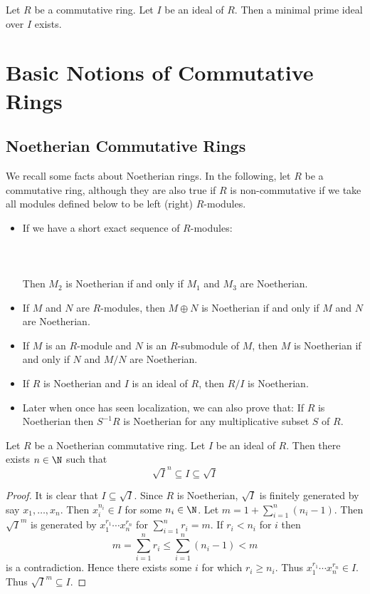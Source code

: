 \documentclass[a4paper]{article}
\begin{document}
\begin{prp}{}{} Let $R$ be a commutative ring. Let $I$ be an ideal of $R$. Then a minimal prime ideal over $I$ exists. 
\end{prp}

\pagebreak
\section{Basic Notions of Commutative Rings}
\subsection{Noetherian Commutative Rings}
We recall some facts about Noetherian rings. In the following, let $R$ be a commutative ring, although they are also true if $R$ is non-commutative if we take all modules defined below to be left (right) $R$-modules. 

\begin{itemize}
\item If we have a short exact sequence of $R$-modules: \\~\\
\\~\\
Then $M_2$ is Noetherian if and only if $M_1$ and $M_3$ are Noetherian. 
\item If $M$ and $N$ are $R$-modules, then $M\oplus N$ is Noetherian if and only if $M$ and $N$ are Noetherian. 
\item If $M$ is an $R$-module and $N$ is an $R$-submodule of $M$, then $M$ is Noetherian if and only if $N$ and $M/N$ are Noetherian.
\item If $R$ is Noetherian and $I$ is an ideal of $R$, then $R/I$ is Noetherian. 
\item Later when once has seen localization, we can also prove that: If $R$ is Noetherian then $S^{-1}R$ is Noetherian for any multiplicative subset $S$ of $R$. 
\end{itemize}

\begin{prp}{}{} Let $R$ be a Noetherian commutative ring. Let $I$ be an ideal of $R$. Then there exists $n\in\N$ such that $$\sqrt{I}^n\subseteq I\subseteq\sqrt{I}$$ \tcbline
\begin{proof}
It is clear that $I\subseteq\sqrt{I}$. Since $R$ is Noetherian, $\sqrt{I}$ is finitely generated by say $x_1,\dots,x_n$. Then $x_i^{n_i}\in I$ for some $n_i\in\N$. Let $m=1+\sum_{i=1}^n(n_i-1)$. Then $\sqrt{I}^m$ is generated by $x_1^{r_1}\cdots x_n^{r_n}$ for $\sum_{i=1}^nr_i=m$. If $r_i<n_i$ for $i$ then $$m=\sum_{i=1}^nr_i\leq\sum_{i=1}^n(n_i-1)<m$$ is a contradiction. Hence there exists some $i$ for which $r_i\geq n_i$. Thus $x_1^{r_1}\cdots x_n^{r_n}\in I$. Thus $\sqrt{I}^m\subseteq I$. 
\end{proof}
\end{prp}
\end{document}

